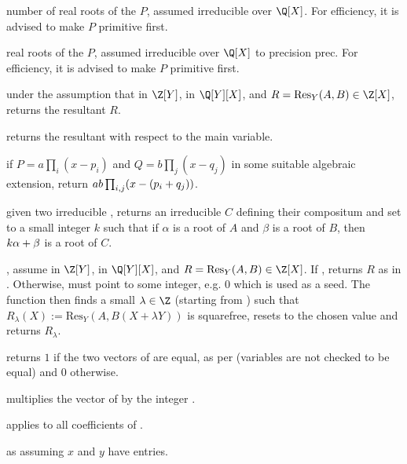  number of real roots of the  $P$,
assumed irreducible over $\Q[X]$. For efficiency, it is advised to make $P$
primitive first.

 real roots of the 
$P$, assumed irreducible over $\Q[X]$ to precision prec. For efficiency, it
is advised to make $P$ primitive first.


under the assumption that  in $\Z[Y]$,  in $\Q[Y][X]$, and
$R = \text{Res}_Y(A, B) \in \Z[X]$, returns the resultant $R$.

 returns the resultant with respect
to the main variable.

 if
$P=a\prod_i(x-p_i)$ and $Q=b\prod_j(x-q_j)$ in some suitable algebraic
extension, return $a\*b\prod_{i,j}(x-(p_i+q_j))$.

given two irreducible , returns an irreducible  $C$ defining
their compositum and set  to a small integer $k$ such that if
$\alpha$ is a root of $A$ and $\beta$ is a root of $B$, then $k\*\alpha +
\beta$ is a root of $C$.

,
assume  in $\Z[Y]$,  in $\Q[Y][X]$, and $R =
\text{Res}_Y(A, B) \in \Z[X]$. If , returns $R$
as in . Otherwise,  must point to
some integer, e.g. $0$ which is used as a seed. The function then finds a
small $\lambda \in \Z$ (starting from ) such that
$R_\lambda(X) := \text{Res}_Y(A, B(X + \lambda Y))$ is squarefree, resets
 to the chosen value and returns $R_{\lambda}$.


 returns $1$ if the two vectors of 
are equal, as per  (variables are not checked to be equal) and
$0$ otherwise.

 multiplies the vector of  
by the integer .

 applies  to all
coefficients of .

 as  assuming $x$
and $y$ have  entries.

